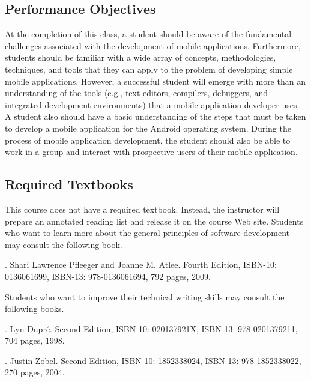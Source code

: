 \subsection*{Performance Objectives}

At the completion of this class, a student should be aware of the fundamental challenges associated with the development 
of mobile applications.  Furthermore, students should be familiar with a wide array of concepts, methodologies, techniques, and
tools that they can apply to the problem of developing simple mobile applications.  However, a successful student will
emerge with more than an understanding of the tools (e.g., text editors, compilers, debuggers, and integrated development
environments) that a mobile application developer uses.  A student also should have a basic understanding of the steps
that must be taken to develop a mobile application for the Android operating system.  During the process of mobile
application development, the student should also be able to work in a group and interact with prospective users of their
mobile application.

\subsection*{Required Textbooks}

This course does not have a required textbook.  Instead, the instructor will prepare an annotated reading list and release it on
the course Web site. Students who want to learn more about the general principles of software development may consult the following book.


. Shari Lawrence Pfleeger and Joanne M. Atlee.
Fourth Edition, ISBN-10: 0136061699, ISBN-13: 978-0136061694, 792 pages, 2009. 

\noindent
Students who want to improve their technical writing skills may consult the following books.

. Lyn Dupr\'e. Second Edition,  ISBN-10: 020137921X,
ISBN-13: 978-0201379211, 704 pages, 1998.

.  Justin Zobel. Second Edition,  ISBN-10: 1852338024, ISBN-13:
978-1852338022, 270 pages, 2004.

